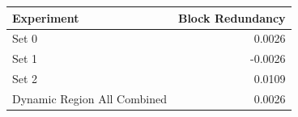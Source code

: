 \begin{tabular}{lr}
\toprule
Experiment & Block Redundancy \\
\midrule
Set 0 & 0.0026 \\
Set 1 & -0.0026 \\
Set 2 & 0.0109 \\
Dynamic Region All Combined & 0.0026 \\
\bottomrule
\end{tabular}
